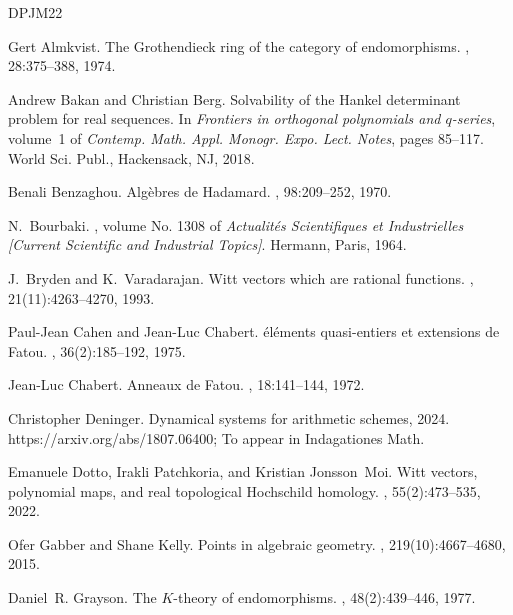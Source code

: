\documentclass[12pt,leqno]{article}
\begin{document}
\begin{thebibliography}{DPJM22}

Gert Almkvist.
\newblock The {G}rothendieck ring of the category of endomorphisms.
, 28:375--388, 1974.

Andrew Bakan and Christian Berg.
\newblock Solvability of the {H}ankel determinant problem for real sequences.
\newblock In {\em Frontiers in orthogonal polynomials and {$q$}-series},
  volume~1 of {\em Contemp. Math. Appl. Monogr. Expo. Lect. Notes}, pages
  85--117. World Sci. Publ., Hackensack, NJ, 2018.

Benali Benzaghou.
\newblock Alg\`ebres de {H}adamard.
, 98:209--252, 1970.

N.~Bourbaki.
, volume No.
  1308 of {\em Actualit\'es Scientifiques et Industrielles [Current Scientific
  and Industrial Topics]}.
\newblock Hermann, Paris, 1964.

J.~Bryden and K.~Varadarajan.
\newblock Witt vectors which are rational functions.
, 21(11):4263--4270, 1993.

Paul-Jean Cahen and Jean-Luc Chabert.
\newblock \'el\'ements quasi-entiers et extensions de {F}atou.
, 36(2):185--192, 1975.

Jean-Luc Chabert.
\newblock Anneaux de {F}atou.
, 18:141--144, 1972.

Christopher Deninger.
\newblock Dynamical systems for arithmetic schemes, 2024.
\newblock https://arxiv.org/abs/1807.06400; {T}o appear in {I}ndagationes
  {M}ath.

Emanuele Dotto, Irakli Patchkoria, and Kristian Jonsson~Moi.
\newblock Witt vectors, polynomial maps, and real topological {H}ochschild
  homology.
, 55(2):473--535, 2022.

Ofer Gabber and Shane Kelly.
\newblock Points in algebraic geometry.
, 219(10):4667--4680, 2015.

Daniel~R. Grayson.
\newblock The {$K$}-theory of endomorphisms.
, 48(2):439--446, 1977.


\end{thebibliography}
\end{document}
